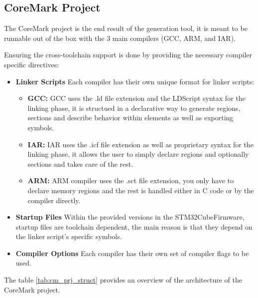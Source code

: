 \subsection{CoreMark Project}
The CoreMark project is the end result of the generation tool, it is meant to be runnable out of the box with the 3 main compilers (GCC, ARM, and IAR).

Ensuring the cross-toolchain support is done by providing the necessary compiler specific directives:
\begin{itemize}
	\item \textbf{Linker Scripts}
	Each compiler has their own unique format for linker scripts:
	\begin{itemize}
		\item \textbf{GCC:} GCC uses the .ld file extension and the LDScript syntax for the linking phase, it is structued in a declarative way to generate regions, sections and describe behavior within elements as well as exporting symbols.
		\item \textbf{IAR:} IAR uses the .icf file extension as well as proprietary syntax for the linking phase, it allows the user to simply declare regions and optionally sections and takes care of the rest.
		\item \textbf{ARM:} ARM compiler uses the .sct file extension, you only have to declare memory regions and the rest is handled either in C code or by the compiler directly.
	\end{itemize}
    \item \textbf{Startup Files} Within the provided versions in the STM32CubeFirmware, startup files are toolchain dependent, the main reason is that they depend on the linker script's specific symbols.
	\item \textbf{Compiler Options} Each compiler has their own set of compiler flags to be used.
\end{itemize}
The table \ref{tab:cm_prj_struct} provides an overview of the architecture of the CoreMark project.
